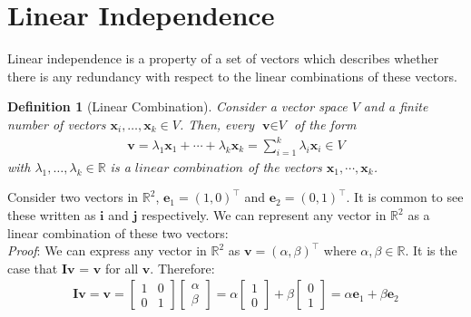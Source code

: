 \documentclass[a4paper,12pt]{article}
\newcommand{\matrx}[1]{\bm{#1}}
\newcommand{\vectr}[1]{\textbf{#1}}
\newcommand{\real}{\mathbb{R}}
\newcommand{\italic}[1]{\textit{#1}}
\newtheorem{definition}{Definition}[section]
\begin{document}
	
	
	\section{Linear Independence}
	Linear independence \cite[page 40]{mml_book} is a property of a set of vectors which describes whether there is any redundancy with respect to the linear combinations of these vectors. 
	\begin{definition}[Linear Combination] \cite[page 40]{mml_book}
		\normalfont	Consider a vector space $\italic{V}$ and a finite number of vectors $\vectr{x}_i,\ldots,\vectr{x}_k \in \italic{V}$. Then, every $\vectr{v} \in \italic{V}$ of the form
		\begin{align}
			\vectr{v} = \lambda_1\vectr{x}_1 + \cdots + \lambda_k\vectr{x}_k =  \sum_{i=1}^{k} \lambda_i\vectr{x}_i \in \italic{V}
		\end{align}
		with $\lambda_1,\ldots,\lambda_k \in \real$ is a $\italic{linear combination}$ of the vectors $\vectr{x}_1,\cdots,\vectr{x}_k$.
		\label{def:linear_combinations}
	\end{definition}
	Consider two vectors in $ \real^2 $, $\vectr{e}_1 = (1, 0)^{\top}$ and $\vectr{e}_2 = (0, 1)^{\top}$. It is common to see these written as $ \vectr{i} $ and $ \vectr{j} $ respectively. We can represent any vector in $ \real^2 $ as a linear combination of these two vectors: \\
	\italic{Proof}:
	We can express any vector in $ \real^{2} $ as $ \vectr{v} = (\alpha, \beta)^{\top} $ where $ \alpha, \beta \in \real $. It is the case that $ \matrx{I}\vectr{v} $ = $ \vectr{v} $ for all $ \vectr{v} $. Therefore:
	\begin{align}
		\matrx{I}\vectr{v} = \vectr{v} = \begin{bmatrix}
			1 & 0 \\
			0 & 1 
		\end{bmatrix} \begin{bmatrix}
			\alpha \\
			\beta 
		\end{bmatrix} = \alpha \begin{bmatrix}
			1 \\
			0 
		\end{bmatrix} + \beta \begin{bmatrix}
			0 \\
			1
		\end{bmatrix} = \alpha \vectr{e}_1 + \beta \vectr{e}_2
	\end{align}
\end{document}
